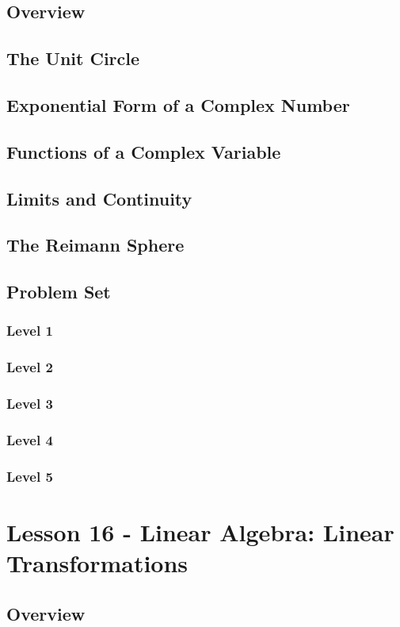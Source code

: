 \documentclass{article}
\begin{document}
\subsection{Overview}
\subsection{The Unit Circle}
\subsection{Exponential Form of a Complex Number}
\subsection{Functions of a Complex Variable}
\subsection{Limits and Continuity}
\subsection{The Reimann Sphere}
\subsection{Problem Set}
\subsubsection{Level 1}
\subsubsection{Level 2}
\subsubsection{Level 3}
\subsubsection{Level 4}
\subsubsection{Level 5}
\pagebreak

\section{Lesson 16 - Linear Algebra: Linear Transformations}
\subsection{Overview}
\end{document}
